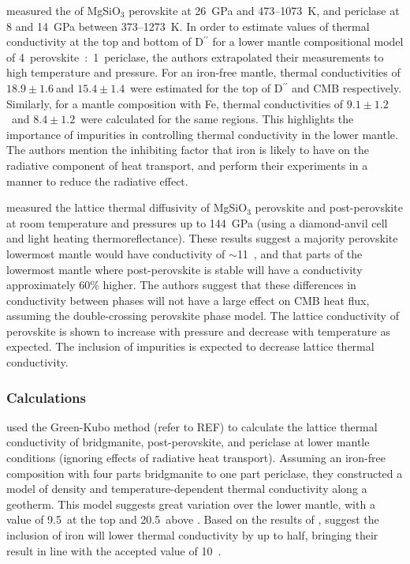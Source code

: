 \citet{Manthilake2011} measured the \tcs of MgSiO$_3$ perovskite at 26~GPa and 473--1073~K, and periclase at 8 and 14~GPa between 373--1273~K. In order to estimate values of thermal conductivity at the top and bottom of D$^{\prime \prime}$ for a lower mantle compositional model of 4~perovskite~:~1~periclase, the authors extrapolated their measurements to high temperature and pressure. For an iron-free mantle, thermal conductivities of $18.9\pm1.6~$\wmks and $15.4\pm1.4$~\wmks were estimated for the top of D$^{\prime \prime}$ and CMB respectively. Similarly, for a mantle composition with Fe, thermal conductivities of $9.1\pm1.2$~\wmks and $8.4\pm1.2$~\wmks were calculated for the same regions. This highlights the importance of impurities in controlling thermal conductivity in the lower mantle. The authors mention the inhibiting factor that iron is likely to have on the radiative component of heat transport, and perform their experiments in a manner to reduce the radiative effect.

\citet{Ohta2012} measured the lattice thermal diffusivity of MgSiO$_3$ perovskite and post-perovskite at room temperature and pressures up to 144~GPa (using a diamond-anvil cell and light heating thermoreflectance). These results suggest a majority perovskite lowermost mantle would have conductivity of $\sim$11~\wmk, and that parts of the lowermost mantle where post-perovskite is stable will have a conductivity approximately 60\% higher. The authors suggest that these differences in conductivity between phases will not have a large effect on CMB heat flux, assuming the double-crossing perovskite phase model. The lattice conductivity of \mgsios perovskite is shown to increase with pressure and decrease with temperature as expected. The inclusion of impurities is expected to decrease lattice thermal conductivity.

\subsubsection{Calculations}

\citet{Haigis2012} used the Green-Kubo method (refer to REF) to calculate the lattice thermal conductivity of bridgmanite, post-perovskite, and periclase at lower mantle conditions (ignoring effects of radiative heat transport). Assuming an iron-free composition with four parts bridgmanite to one part periclase, they constructed a model of density and temperature-dependent thermal conductivity along a geotherm. This model suggests great variation over the lower mantle, with a value of 9.5~\wmks at the top and 20.5~\wmks above \ddd. Based on the results of \citet{Manthilake2011}, \citet{Haigis2012} suggest the inclusion of iron will lower thermal conductivity by up to half, bringing their result in line with the accepted value of 10~\wmk \citep{Lay2006}. %

